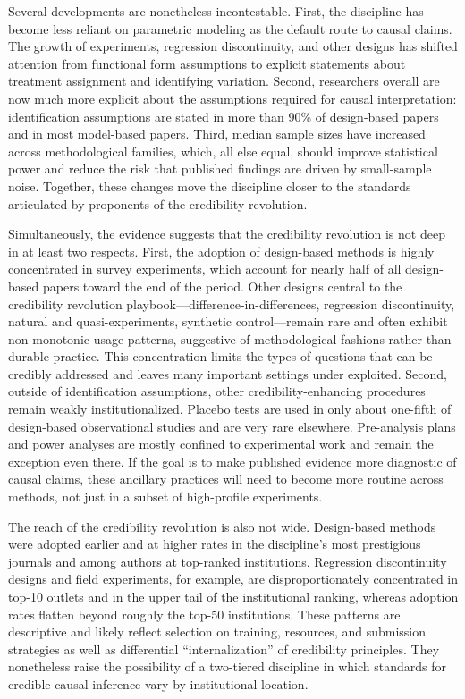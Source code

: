 \documentclass[12pt]{article}
\begin{document}
Several developments are nonetheless incontestable. First, the discipline has become less reliant on parametric modeling as the default route to causal claims. The growth of experiments, regression discontinuity, and other designs has shifted attention from functional form assumptions to explicit statements about treatment assignment and identifying variation. Second, researchers overall are now much more explicit about the assumptions required for causal interpretation: identification assumptions are stated in more than 90\% of design-based papers and in most model-based papers. Third, median sample sizes have increased across methodological families, which, all else equal, should improve statistical power and reduce the risk that published findings are driven by small-sample noise. Together, these changes move the discipline closer to the standards articulated by proponents of the credibility revolution.

Simultaneously, the evidence suggests that the credibility revolution is not deep in at least two respects. First, the adoption of design-based methods is highly concentrated in survey experiments, which account for nearly half of all design-based papers toward the end of the period. Other designs central to the credibility revolution playbook---difference-in-differences, regression discontinuity, natural and quasi-experiments, synthetic control---remain rare and often exhibit non-monotonic usage patterns, suggestive of methodological fashions rather than durable practice. This concentration limits the types of questions that can be credibly addressed and leaves many important settings under exploited. Second, outside of identification assumptions, other credibility-enhancing procedures remain weakly institutionalized. Placebo tests are used in only about one-fifth of design-based observational studies and are very rare elsewhere. Pre-analysis plans and power analyses are mostly confined to experimental work and remain the exception even there. If the goal is to make published evidence more diagnostic of causal claims, these ancillary practices will need to become more routine across methods, not just in a subset of high-profile experiments. %

The reach of the credibility revolution is also not wide. Design-based methods were adopted earlier and at higher rates in the discipline's most prestigious journals and among authors at top-ranked institutions. Regression discontinuity designs and field experiments, for example, are disproportionately concentrated in top-10 outlets and in the upper tail of the institutional ranking, whereas adoption rates flatten beyond roughly the top-50 institutions. These patterns are descriptive and likely reflect selection on training, resources, and submission strategies as well as differential ``internalization'' of credibility principles. They nonetheless raise the possibility of a two-tiered discipline in which standards for credible causal inference vary by institutional location. 
\end{document}
